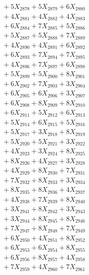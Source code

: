 \documentclass[a4paper,10pt]{article}
\begin{document}
{\begin{align}
&\;  + 5 X_{2878} + 5 X_{2879} + 6 X_{2880} \\[0.3ex]
&\;  + 4 X_{2881} + 4 X_{2882} + 4 X_{2883} \\[0.3ex]
&\;  + 6 X_{2884} + 7 X_{2885} + 5 X_{2886} \\[0.3ex]
&\;  + 5 X_{2887} + 5 X_{2888} + 7 X_{2889} \\[0.5ex]\allowbreak
&\;  + 4 X_{2890} + 4 X_{2891} + 6 X_{2892} \\[0.3ex]
&\;  + 6 X_{2893} + 7 X_{2894} + 7 X_{2895} \\[0.3ex]
&\;  + 4 X_{2896} + 7 X_{2897} + 6 X_{2898} \\[0.3ex]
&\;  + 5 X_{2899} + 5 X_{2900} + 8 X_{2901} \\[0.3ex]
&\;  + 6 X_{2902} + 7 X_{2903} + 3 X_{2904} \\[0.3ex]
&\;  + 6 X_{2905} + 6 X_{2906} + 3 X_{2907} \\[0.3ex]
&\;  + 6 X_{2908} + 8 X_{2909} + 8 X_{2910} \\[0.3ex]
&\;  + 6 X_{2911} + 5 X_{2912} + 6 X_{2913} \\[0.3ex]
&\;  + 5 X_{2914} + 6 X_{2915} + 5 X_{2916} \\[0.3ex]
&\;  + 5 X_{2917} + 3 X_{2918} + 8 X_{2919} \\[0.5ex]\allowbreak
&\;  + 5 X_{2920} + 5 X_{2921} + 3 X_{2922} \\[0.3ex]
&\;  + 4 X_{2923} + 3 X_{2924} + 8 X_{2925} \\[0.3ex]
&\;  + 8 X_{2926} + 4 X_{2927} + 3 X_{2928} \\[0.3ex]
&\;  + 4 X_{2929} + 8 X_{2930} + 7 X_{2931} \\[0.3ex]
&\;  + 7 X_{2932} + 8 X_{2933} + 3 X_{2934} \\[0.3ex]
&\;  + 8 X_{2935} + 8 X_{2936} + 4 X_{2937} \\[0.3ex]
&\;  + 4 X_{2938} + 7 X_{2939} + 8 X_{2940} \\[0.3ex]
&\;  + 3 X_{2941} + 8 X_{2942} + 3 X_{2943} \\[0.3ex]
&\;  + 3 X_{2944} + 8 X_{2945} + 8 X_{2946} \\[0.3ex]
&\;  + 7 X_{2947} + 8 X_{2948} + 7 X_{2949} \\[0.5ex]\allowbreak
&\;  + 6 X_{2950} + 4 X_{2951} + 8 X_{2952} \\[0.3ex]
&\;  + 6 X_{2953} + 6 X_{2954} + 8 X_{2955} \\[0.3ex]
&\;  + 6 X_{2956} + 8 X_{2957} + 4 X_{2958} \\[0.3ex]
&\;  + 7 X_{2959} + 4 X_{2960} + 7 X_{2961} \\[0.3ex]

\end{align}}
\end{document}
